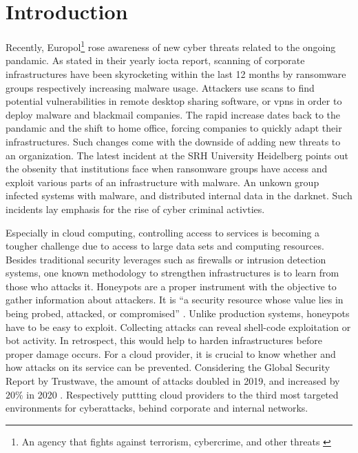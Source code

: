\chapter{Introduction}

Recently, Europol\footnote{An agency that fights against terrorism, cybercrime, and other threats \cite{europol2021}} rose awareness of new cyber threats related to the ongoing pandamic.
As stated in their yearly \ac{iocta} report, scanning of corporate infrastructures have been skyrocketing within the last 12 months by ransomware groups respectively increasing malware usage.
Attackers use scans to find potential vulnerabilities in remote desktop sharing software, or \acp{vpn} in order to deploy malware and blackmail companies. \cite{iocta2020}
The rapid increase dates back to the pandamic and the shift to home office, forcing companies to quickly adapt their infrastructures.
Such changes come with the downside of adding new threats to an organization.
The latest incident at the SRH University Heidelberg points out the obsenity that institutions face when ransomware groups have access and exploit various parts of an infrastructure with malware.
An unkown group infected systems with malware, and distributed internal data in the darknet.
Such incidents lay emphasis for the rise of cyber criminal activties.

Especially in cloud computing, controlling access to services is becoming a tougher challenge due to access to large data sets and computing resources.
Besides traditional security leverages such as firewalls or intrusion detection systems, one known methodology to strengthen infrastructures is to learn from those who attacks it.
Honeypots are a proper instrument with the objective to gather information about attackers.
It is \enquote{a security resource whose value lies in being probed, attacked, or compromised} \cite{Spitzner2003}.
Unlike production systems, honeypots have to be easy to exploit. 
Collecting attacks can reveal shell-code exploitation or bot activity.
In retrospect, this would help to harden infrastructures before proper damage occurs.
For a cloud provider, it is crucial to know whether and how attacks on its service can be prevented.
Considering the Global Security Report by Trustwave, the amount of attacks doubled in 2019, and increased by $20\%$ in 2020 \cite{fahim2020}.
Respectively puttting cloud providers to the third most targeted environments for cyberattacks, behind corporate and internal networks.

